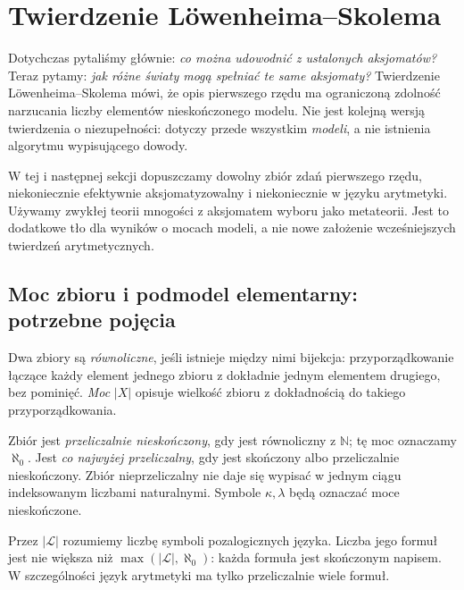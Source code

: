 \section{Twierdzenie Löwenheima--Skolema}\label{sec:loewenheim-skolem}

\providecommand{\atlasref}[2]{#2}
Dotychczas pytaliśmy głównie: \emph{co można udowodnić z ustalonych aksjomatów?} Teraz pytamy: \emph{jak różne światy mogą spełniać te same aksjomaty?} Twierdzenie Löwenheima--Skolema mówi, że opis pierwszego rzędu ma ograniczoną zdolność narzucania liczby elementów nieskończonego modelu. Nie jest kolejną wersją twierdzenia o niezupełności: dotyczy przede wszystkim \emph{modeli}, a nie istnienia algorytmu wypisującego dowody.

W tej i następnej sekcji dopuszczamy dowolny zbiór zdań pierwszego rzędu, niekoniecznie efektywnie aksjomatyzowalny i niekoniecznie w języku arytmetyki. Używamy zwykłej teorii mnogości z aksjomatem wyboru jako metateorii. Jest to dodatkowe tło dla wyników o mocach modeli, a nie nowe założenie wcześniejszych twierdzeń arytmetycznych.

\subsection*{Moc zbioru i podmodel elementarny: potrzebne pojęcia}\label{sec:14:1}
\begin{definicja}\label{res:14:1}
Dwa zbiory są \emph{równoliczne}, jeśli istnieje między nimi bijekcja: przyporządkowanie łączące każdy element jednego zbioru z dokładnie jednym elementem drugiego, bez pominięć. \emph{Moc} $|X|$ opisuje wielkość zbioru z dokładnością do takiego przyporządkowania.

Zbiór jest \emph{przeliczalnie nieskończony}, gdy jest równoliczny z $\mathbb N$; tę moc oznaczamy $\aleph_0$. Jest \emph{co najwyżej przeliczalny}, gdy jest skończony albo przeliczalnie nieskończony. Zbiór nieprzeliczalny nie daje się wypisać w jednym ciągu indeksowanym liczbami naturalnymi. Symbole $\kappa,\lambda$ będą oznaczać moce nieskończone.

Przez $|\mathcal L|$ rozumiemy liczbę symboli pozalogicznych języka. Liczba jego formuł jest nie większa niż $\max(|\mathcal L|,\aleph_0)$: każda formuła jest skończonym napisem. W szczególności język arytmetyki ma tylko przeliczalnie wiele formuł.
\end{definicja}

